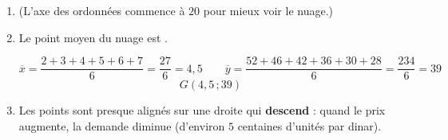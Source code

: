 \begin{enumerate}[itemsep=14pt]
  \item
  \begin{center}
  \end{center}
  (L'axe des ordonnées commence à $20$ pour mieux voir le nuage.)

  \item
  \begin{prop}
  Le point moyen du nuage est .
  \end{prop}
  \[\overline x=\dfrac{2+3+4+5+6+7}{6}=\dfrac{27}{6}=4{,}5\qquad\overline y=\dfrac{52+46+42+36+30+28}{6}=\dfrac{234}{6}=39\]
  \[G(4{,}5\,;39)\]

  \item Les points sont presque alignés sur une droite qui \textbf{descend} : quand le prix augmente, la demande diminue (d'environ $5$ centaines d'unités par dinar).
\end{enumerate}
